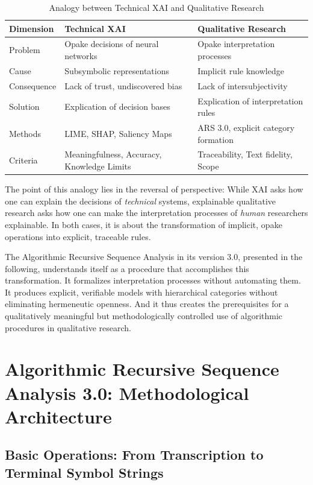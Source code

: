 \documentclass[
  12pt,
  a4paper,
  oneside,
  titlepage
]{article}
\begin{document}
\begin{table}[h]
\centering
\caption{Analogy between Technical XAI and Qualitative Research}
\label{tab:analogy}
\begin{tabular}{@{} p{2.5cm} p{5cm} p{5cm} @{}}
\toprule
\textbf{Dimension} & \textbf{Technical XAI} & \textbf{Qualitative Research} \\
\midrule
Problem & Opake decisions of neural networks & Opake interpretation processes \\
Cause & Subsymbolic representations & Implicit rule knowledge \\
Consequence & Lack of trust, undiscovered bias & Lack of intersubjectivity \\
Solution & Explication of decision bases & Explication of interpretation rules \\
Methods & LIME, SHAP, Saliency Maps & ARS 3.0, explicit category formation \\
Criteria & Meaningfulness, Accuracy, Knowledge Limits & Traceability, Text fidelity, Scope \\
\bottomrule
\end{tabular}
\end{table}

The point of this analogy lies in the reversal of perspective: While 
XAI asks how one can explain the decisions of \textit{technical} 
systems, explainable qualitative research asks how one can make the 
interpretation processes of \textit{human} researchers explainable. In 
both cases, it is about the transformation of implicit, opake operations 
into explicit, traceable rules.

The Algorithmic Recursive Sequence Analysis in its version 3.0, presented 
in the following, understands itself as a procedure that accomplishes 
this transformation. It formalizes interpretation processes without 
automating them. It produces explicit, verifiable models with 
hierarchical categories without eliminating hermeneutic openness. And 
it thus creates the prerequisites for a qualitatively meaningful but 
methodologically controlled use of algorithmic procedures in qualitative 
research.

\section{Algorithmic Recursive Sequence Analysis 3.0: Methodological Architecture}

\subsection{Basic Operations: From Transcription to Terminal Symbol Strings}
\end{document}
